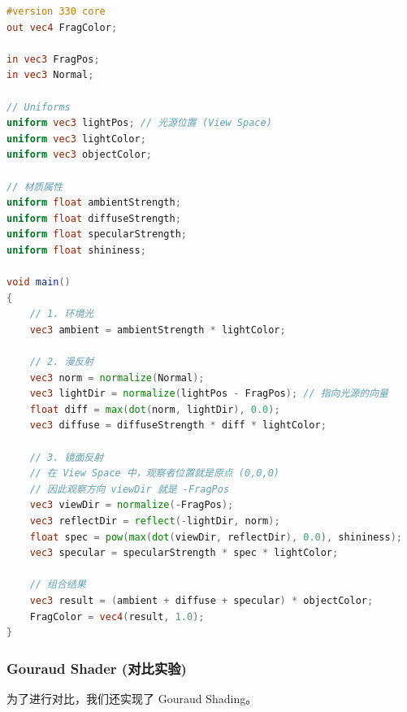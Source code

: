 \documentclass[a4paper]{article}
\begin{document}
\begin{lstlisting}[language=GLSL, caption={phong.frag}]
#version 330 core
out vec4 FragColor;

in vec3 FragPos;
in vec3 Normal;

// Uniforms
uniform vec3 lightPos; // 光源位置 (View Space)
uniform vec3 lightColor;
uniform vec3 objectColor;

// 材质属性
uniform float ambientStrength;
uniform float diffuseStrength;
uniform float specularStrength;
uniform float shininess;

void main()
{
    // 1. 环境光
    vec3 ambient = ambientStrength * lightColor;
  
    // 2. 漫反射
    vec3 norm = normalize(Normal);
    vec3 lightDir = normalize(lightPos - FragPos); // 指向光源的向量
    float diff = max(dot(norm, lightDir), 0.0);
    vec3 diffuse = diffuseStrength * diff * lightColor;
    
    // 3. 镜面反射
    // 在 View Space 中，观察者位置就是原点 (0,0,0)
    // 因此观察方向 viewDir 就是 -FragPos
    vec3 viewDir = normalize(-FragPos); 
    vec3 reflectDir = reflect(-lightDir, norm);  
    float spec = pow(max(dot(viewDir, reflectDir), 0.0), shininess);
    vec3 specular = specularStrength * spec * lightColor;  
        
    // 组合结果
    vec3 result = (ambient + diffuse + specular) * objectColor;
    FragColor = vec4(result, 1.0);
}
\end{lstlisting}

\subsubsection{Gouraud Shader (对比实验)}
为了进行对比，我们还实现了 Gouraud Shading。
\end{document}
